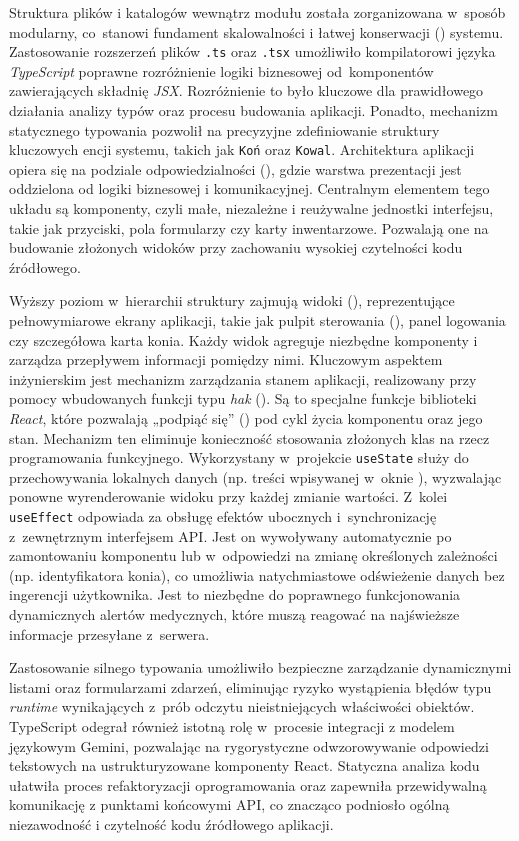 Struktura plików i katalogów wewnątrz modułu została zorganizowana w~sposób modularny, co~stanowi fundament skalowalności i łatwej konserwacji () systemu.  Zastosowanie rozszerzeń plików \texttt{.ts} oraz \texttt{.tsx} umożliwiło kompilatorowi języka \textit{TypeScript} poprawne rozróżnienie logiki biznesowej od~komponentów zawierających składnię \textit{JSX}. Rozróżnienie to było kluczowe dla prawidłowego działania analizy typów oraz procesu budowania aplikacji. Ponadto, mechanizm statycznego typowania pozwolił na precyzyjne zdefiniowanie struktury kluczowych encji systemu, takich jak \texttt{Koń} oraz \texttt{Kowal}. Architektura aplikacji opiera się na podziale odpowiedzialności (), gdzie warstwa prezentacji jest oddzielona od logiki biznesowej i komunikacyjnej. Centralnym elementem tego układu są komponenty, czyli małe, niezależne i reużywalne jednostki interfejsu, takie jak przyciski, pola formularzy czy karty inwentarzowe. Pozwalają one na budowanie złożonych widoków przy zachowaniu wysokiej czytelności kodu źródłowego.

Wyższy poziom w~hierarchii struktury zajmują widoki (), reprezentujące pełnowymiarowe ekrany aplikacji, takie jak pulpit sterowania (), panel logowania czy szczegółowa karta konia. Każdy widok agreguje niezbędne komponenty i zarządza przepływem informacji pomiędzy nimi. Kluczowym aspektem inżynierskim jest mechanizm zarządzania stanem aplikacji, realizowany przy pomocy wbudowanych funkcji typu \textit{hak} (). Są to specjalne funkcje biblioteki \textit{React}, które pozwalają „podpiąć się” () pod cykl życia komponentu oraz jego stan. Mechanizm ten eliminuje konieczność stosowania złożonych klas na rzecz programowania funkcyjnego. Wykorzystany w~projekcie \texttt{useState} służy do przechowywania lokalnych danych (np. treści wpisywanej w~oknie ), wyzwalając ponowne wyrenderowanie widoku przy każdej zmianie wartości. Z~kolei \texttt{useEffect} odpowiada za obsługę efektów ubocznych i~synchronizację z~zewnętrznym interfejsem API. Jest on wywoływany automatycznie po zamontowaniu komponentu lub w~odpowiedzi na zmianę określonych zależności (np. identyfikatora konia), co umożliwia natychmiastowe odświeżenie danych bez ingerencji użytkownika. Jest to niezbędne do poprawnego funkcjonowania dynamicznych alertów medycznych, które muszą reagować na najświeższe informacje przesyłane z~serwera.

Zastosowanie silnego typowania umożliwiło bezpieczne zarządzanie dynamicznymi listami oraz formularzami zdarzeń, eliminując ryzyko wystąpienia błędów typu \textit{runtime} wynikających z~prób odczytu nieistniejących właściwości obiektów. TypeScript odegrał również istotną rolę w~procesie integracji z modelem językowym Gemini, pozwalając na rygorystyczne odwzorowywanie odpowiedzi tekstowych na ustrukturyzowane komponenty React. Statyczna analiza kodu ułatwiła proces refaktoryzacji oprogramowania oraz zapewniła przewidywalną komunikację z punktami końcowymi API, co znacząco podniosło ogólną niezawodność i czytelność kodu źródłowego aplikacji.

